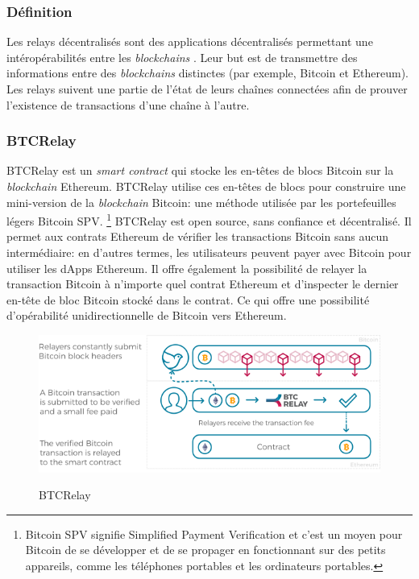 \subsubsection{Définition}
Les \gls{relay}s décentralisés sont des applications décentralisés permettant une intéropérabilités entre les \textit{\gls{blockchain}s} \cite{qin2018overview, westerkamp2022verilay,belchior2022survey}.
Leur but est de transmettre des informations entre des \textit{\gls{blockchain}s} distinctes (par exemple, \gls{Bitcoin} et \gls{Ethereum}). 
Les \gls{relay}s suivent une partie de l’état de leurs chaînes connectées afin de prouver l’existence de transactions d’une chaîne à l’autre.

\subsubsection{BTCRelay}
BTCRelay est un \textit{\gls{smart contract}} qui stocke les en-têtes de blocs \gls{Bitcoin} sur la \textit{\gls{blockchain}} \gls{Ethereum}. \cite{qin2018overview,belchior2022survey,btcrelay2022web,btcrelay2022git}
BTCRelay utilise ces en-têtes de blocs pour construire une mini-version de la \textit{\gls{blockchain}} \gls{Bitcoin}: une méthode utilisée par les 
portefeuilles légers \gls{Bitcoin} SPV. \footnote{\gls{Bitcoin} SPV signifie Simplified Payment Verification et c’est un moyen pour \gls{Bitcoin} de se 
développer et de se propager en fonctionnant sur des petits appareils, comme les téléphones portables et les ordinateurs portables.}
BTCRelay est open source, sans confiance et décentralisé. Il permet aux contrats \gls{Ethereum} de vérifier les transactions \gls{Bitcoin} sans aucun 
intermédiaire: en d’autres termes, les utilisateurs peuvent payer avec \gls{Bitcoin} pour utiliser les \gls{dApp}s \gls{Ethereum}. Il offre également la 
possibilité de relayer la transaction \gls{Bitcoin} à n’importe quel contrat \gls{Ethereum} et d’inspecter le dernier en-tête de bloc \gls{Bitcoin} stocké 
dans le contrat. Ce qui offre une possibilité d'opérabilité unidirectionnelle de \gls{Bitcoin} vers \gls{Ethereum}.\\

\begin{figure}[h!]
  \centering
  \includegraphics[scale=0.5]{decentralisation/btcRelay.png}
  \label{fig:btcRelay}
  \caption{BTCRelay}
\end{figure}

